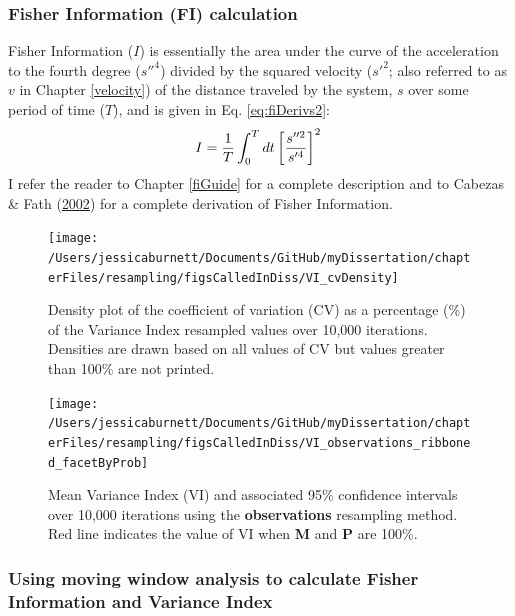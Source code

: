 \documentclass[12pt,twoside,openany]{reedthesis}
\begin{document}
\hypertarget{fisher-information-fi-calculation}{%
\subsubsection{Fisher Information (FI) calculation}\label{fisher-information-fi-calculation}}

Fisher Information (\(I\)) is essentially the area under the curve of the acceleration to the fourth degree (\(s''^4\)) divided by the squared velocity (\(s'^2\); also referred to as \(v\) in Chapter \ref{velocity}) of the distance traveled by the system, \(s\) over some period of time (\(T\)), and is given in Eq. \eqref{eq:fiDerivs2}:
\begin{equation}   
    I = \frac{1}{T} \int_0^T dt\left[\frac{s''^2}{s'^4}\right]^2 \\  
  \label{eq:fiDerivs2}  
\end{equation}
I refer the reader to Chapter \ref{fiGuide} for a complete description and to Cabezas \& Fath (\protect\hyperlink{ref-cabezas_towards_2002}{2002}) for a complete derivation of Fisher Information.

\begin{figure}[bth]

{\centering \texttt{[image: /Users/jessicaburnett/Documents/GitHub/myDissertation/chapterFiles/resampling/figsCalledInDiss/VI\_cvDensity]} 

}

\caption{Density plot of the coefficient of variation (CV) as a percentage (\%) of the Variance Index resampled values over 10,000 iterations. Densities are drawn based on all values of CV but values greater than 100\% are not printed.}\label{fig:viCV}
\end{figure}

\begin{figure}[bth]

{\centering \texttt{[image: /Users/jessicaburnett/Documents/GitHub/myDissertation/chapterFiles/resampling/figsCalledInDiss/VI\_observations\_ribboned\_facetByProb]} 

}

\caption{Mean Variance Index (VI) and associated 95\% confidence intervals over 10,000 iterations using the \textbf{observations} resampling method. Red line indicates the value of VI when \textbf{M} and \textbf{P} are 100\%.}\label{fig:viResamp}
\end{figure}
\hypertarget{using-moving-window-analysis-to-calculate-fisher-information-and-variance-index}{%
\subsubsection{Using moving window analysis to calculate Fisher Information and Variance Index}\label{using-moving-window-analysis-to-calculate-fisher-information-and-variance-index}}
\end{document}

